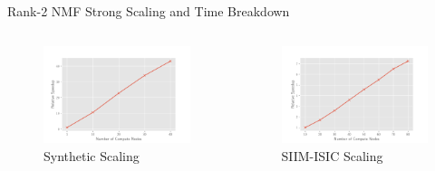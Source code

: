 \documentclass{beamer}
\newcommand{\image}{SIIM-ISIC}
\begin{document}
\begin{frame}{Rank-2 NMF Strong Scaling and Time Breakdown}
    \centering
    \begin{columns}
        \begin{column}{0.5\textwidth}
            \begin{figure}
            \includegraphics[width=\figscal]{../plots/synthetic_rank2_speedup.pdf}
            \caption{Synthetic Scaling}
            \end{figure}
        \end{column}
        \begin{column}{0.5\textwidth}
            \begin{figure}
            \includegraphics[width=\figscal]{../plots/realworld_rank2_speedup.pdf}
            \caption{\image{} Scaling}
            \end{figure}
        \end{column}

\end{columns}
\end{frame}
\end{document}
